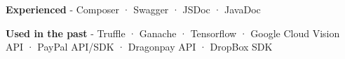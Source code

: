 \begin{cventries}
{\begin{cvitems}
        \item {\textbf{Experienced} \hspace{0.03cm} - \hspace{0.03cm} Composer \hspace{0.03cm} · \hspace{0.03cm} Swagger \hspace{0.03cm} · \hspace{0.03cm} JSDoc \hspace{0.03cm} · \hspace{0.03cm} JavaDoc} %
        \item {\textbf{Used in the past} \hspace{0.03cm} - \hspace{0.03cm} Truffle \hspace{0.03cm} · \hspace{0.03cm} Ganache \hspace{0.03cm} · \hspace{0.03cm} Tensorflow \hspace{0.03cm} · \hspace{0.03cm} Google Cloud Vision API \hspace{0.03cm} · \hspace{0.03cm} PayPal API/SDK \hspace{0.03cm} · \hspace{0.03cm} Dragonpay API \hspace{0.03cm} · \hspace{0.03cm} DropBox SDK \\} %
      \end{cvitems}
    }

\end{cventries}
